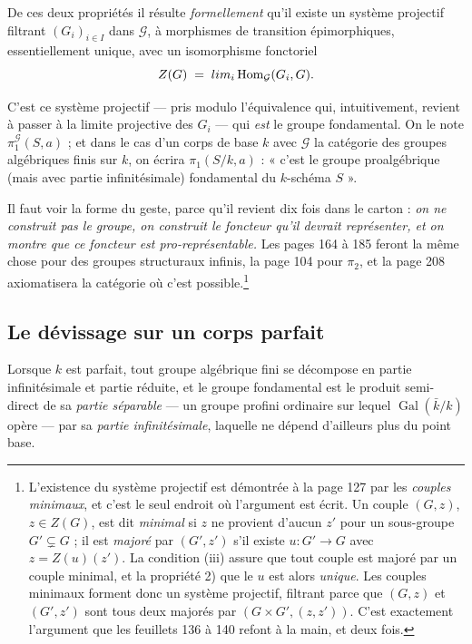 \documentclass[11pt,a4paper]{article}
\begin{document}
De ces deux propriétés il résulte \emph{formellement} qu'il existe un système
projectif filtrant $(G_{i})_{i \in I}$ dans $\mathcal{G}$, à morphismes de
transition épimorphiques, essentiellement unique, avec un isomorphisme
fonctoriel
\[
  Z(G) \;=\; \varinjlim_{i} \operatorname{Hom}_{\mathcal{G}}(G_{i}, G) .
\]

C'est ce système projectif --- pris modulo l'équivalence qui, intuitivement,
revient à passer à la limite projective des $G_{i}$ --- qui \emph{est} le
groupe fondamental. On le note $\pi_{1}^{\mathcal{G}}(S, a)$ ; et dans le cas
d'un corps de base $k$ avec $\mathcal{G}$ la catégorie des groupes algébriques
finis sur $k$, on écrira $\pi_{1}(S/k, a)$ : « c'est le groupe proalgébrique
(mais avec partie infinitésimale) fondamental du $k$-schéma $S$ ».

Il faut voir la forme du geste, parce qu'il revient dix fois dans le carton :
\emph{on ne construit pas le groupe, on construit le foncteur qu'il devrait
représenter, et on montre que ce foncteur est pro-représentable.} Les pages 164
à 185 feront la même chose pour des groupes structuraux infinis, la page 104
pour $\pi_{2}$, et la page 208 axiomatisera la catégorie où c'est
possible.\footnote{L'existence du système projectif est démontrée à la page 127
par les \emph{couples minimaux}, et c'est le seul endroit où l'argument est
écrit. Un couple $(G, z)$, $z \in Z(G)$, est dit \emph{minimal} si $z$ ne
provient d'aucun $z'$ pour un sous-groupe $G' \subsetneq G$ ; il est
\emph{majoré} par $(G', z')$ s'il existe $u : G' \to G$ avec $z = Z(u)(z')$.
La condition (iii) assure que tout couple est majoré par un couple minimal, et
la propriété 2) que le $u$ est alors \emph{unique}. Les couples minimaux
forment donc un système projectif, filtrant parce que $(G,z)$ et $(G',z')$ sont
tous deux majorés par $(G\times G', (z,z'))$. C'est exactement l'argument que
les feuillets 136 à 140 refont à la main, et deux fois.}

\subsection*{Le dévissage sur un corps parfait}

Lorsque $k$ est parfait, tout groupe algébrique fini se décompose en partie
infinitésimale et partie réduite, et le groupe fondamental est le produit
semi-direct de sa \emph{partie séparable} --- un groupe profini ordinaire sur
lequel $\operatorname{Gal}(\bar{k}/k)$ opère --- par sa \emph{partie
infinitésimale}, laquelle ne dépend d'ailleurs plus du point base.
\end{document}

